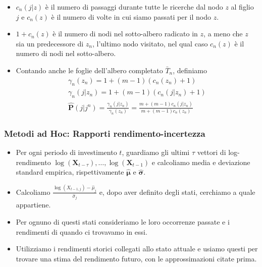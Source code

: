 \documentclass{beamer}
\theoremstyle{plain}
\theoremstyle{definition}
\theoremstyle{remark}
\newcommand{\X}{\bm{X}}
\newcommand{\Ph}{\hat{\mathbf{P}}}
\begin{document}
\begin{frame}
\begin{itemize}
\item $c_n(j|z)$ è  il numero di passaggi durante tutte le ricerche dal nodo $z$ al figlio $j$ e $c_n(z)$ è il numero di volte in cui siamo passati per il nodo $z$.
\item $1+c_n(z)$ è il numero di nodi nel sotto-albero radicato in $z$, a meno che $z$ sia un predecessore di $z_n$, l'ultimo nodo visitato, nel qual caso $c_n(z)$ è il numero di nodi nel sotto-albero.
\item Contando anche le foglie dell'albero completato $\bar{T}_n$, definiamo 
\begin{align*}
\gamma_n(z_n) = 1+(m-1)(c_n(z_n)+1)\\
\gamma_n(j|z_n) = 1+(m-1)(c_n(j|z_n)+1)\\
\Ph(j|j^n) = \frac{\gamma_n(j|z_n)}{\gamma_n(z_n)}=\frac{m+(m-1)c_n(j|z_n)}{m+(m-1)c_n(z_n)}
\end{align*}
\end{itemize}
\end{frame}

\begin{frame}
\frametitle{Metodi ad Hoc: Rapporti rendimento-incertezza}
\begin{itemize}
\item Per ogni periodo di investimento $t$, guardiamo gli ultimi $\tau$ vettori di log-rendimento $\log(\X_{t-\tau}),\ldots, \log(\X_{t-1})$ e calcoliamo media e deviazione standard empirica, rispettivamente $\hat{\bm{\mu}}$ e $\hat{\bm{\sigma}}$.
\item Calcoliamo $\frac{\log (X_{t-1,j})-\hat{\mu}_j}{\hat{\sigma}_j}$ e, dopo aver definito degli stati, cerchiamo a quale appartiene.
\item Per ognuno di questi stati consideriamo le loro occorrenze passate e i rendimenti di quando ci trovavamo in essi.
\item Utilizziamo i rendimenti storici collegati allo stato attuale e usiamo questi per trovare una stima del rendimento futuro, con le approssimazioni citate prima. 
\end{itemize}
\end{frame}
\end{document}
